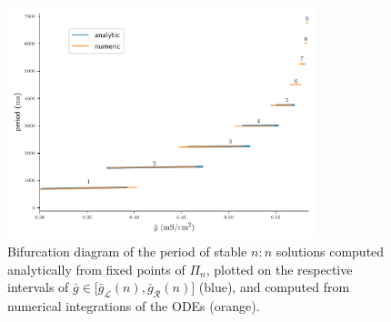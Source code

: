 \documentclass[utf8]{frontiersFPHY} %
\newcommand{\gbar}{\bar g}
\begin{document}
\begin{figure}[h!]
  \centering
  \includegraphics[width=0.8\textwidth]{final-bif}
  \caption{Bifurcation diagram of the period of stable $n:n$ solutions computed analytically from fixed points of $\Pi_n$, plotted on the respective intervals of $\gbar\in \big[\gbar_{\mathcal{L}}(n),\gbar_{\mathcal{R}}(n)\big]$ (blue), and computed from numerical integrations of the ODEs (orange).~\label{fig:final-bif}}
\end{figure}
\end{document}
